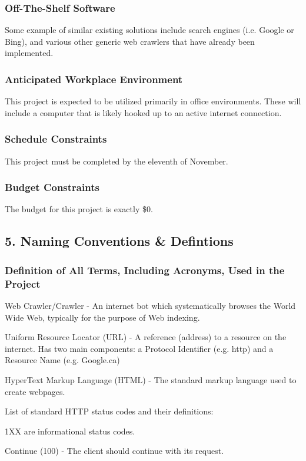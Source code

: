 \documentclass[titlepage]{article}
\begin{document}
\subsubsection*{Off-The-Shelf Software}
Some example of similar existing solutions include search engines (i.e. Google or Bing), and various other generic web crawlers that have already been implemented.

\subsubsection*{Anticipated Workplace Environment}
This project is expected to be utilized primarily in office environments. These will include a computer that is likely hooked up to an active internet connection.

\subsubsection*{Schedule Constraints}
This project must be completed by the eleventh of November.

\subsubsection*{Budget Constraints}
The budget for this project is exactly \$0.


\subsection{5. Naming Conventions \& Defintions}

\subsubsection*{Definition of All Terms, Including Acronyms, Used in the Project}
Web Crawler/Crawler - An internet bot which systematically browses the World Wide Web, typically for the purpose of Web indexing.

Uniform Resource Locator (URL) - A reference (address) to a resource on the internet. Has two main components: a Protocol Identifier (e.g. http) and a Resource Name (e.g. Google.ca)

HyperText Markup Language (HTML) - The standard markup language used to create webpages.

List of standard HTTP status codes and their definitions:

1XX are informational status codes.

Continue (100) - The client should continue with its request.
\end{document}
